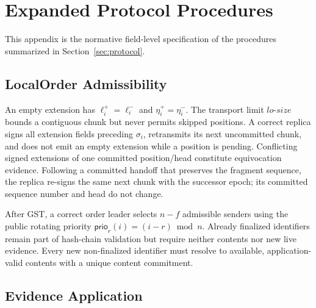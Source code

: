 \section{Expanded Protocol Procedures}
\label{app:expanded-protocol}

This appendix is the normative field-level specification of the procedures
summarized in Section~\ref{sec:protocol}.

\subsection{LocalOrder Admissibility}

An empty extension has $\ell_i^+=\ell_i^-$ and
$\eta_i^+=\eta_i^-$.  The transport limit $lo\text{-}size$ bounds a contiguous chunk but never permits skipped positions.  A correct replica signs all extension fields preceding $\sigma_i$, retransmits its next uncommitted chunk, and does not emit an empty extension while a position is pending.  Conflicting signed extensions of one committed position/head constitute equivocation evidence.  Following a committed handoff that preserves the fragment sequence, the replica re-signs the same next chunk with the successor epoch; its committed sequence number and head do not change.

After GST, a correct order leader selects $n-f$ admissible senders using the public rotating priority $\mathsf{prio}_r(i)=(i-r)\bmod n$.  Already finalized identifiers remain part of hash-chain validation but require neither contents nor new live evidence.  Every new non-finalized identifier must resolve to available, application-valid contents with a unique content commitment.

\subsection{Evidence Application}

